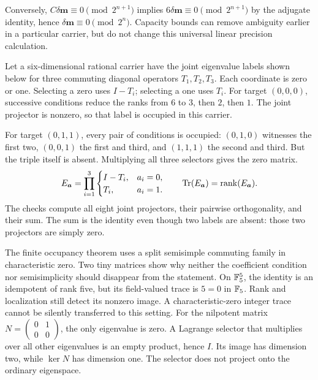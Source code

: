 Conversely, $C\delta\bm m\equiv0\pmod{2^{n+1}}$ implies $6\delta\bm m\equiv0\pmod{2^{n+1}}$ by the adjugate identity, hence $\delta\bm m\equiv0\pmod{2^n}$. Capacity bounds can remove ambiguity earlier in a particular carrier, but do not change this universal linear precision calculation.

Let a six-dimensional rational carrier have the joint eigenvalue labels shown below for three commuting diagonal operators $T_1,T_2,T_3$. Each coordinate is zero or one. Selecting a zero uses $I-T_i$; selecting a one uses $T_i$.
For target $(0,0,0)$, successive conditions reduce the ranks from $6$ to $3$, then $2$, then $1$. The joint projector is nonzero, so that label is occupied in this carrier.

For target $(0,1,1)$, every pair of conditions is occupied: $(0,1,0)$ witnesses the first two, $(0,0,1)$ the first and third, and $(1,1,1)$ the second and third. But the triple itself is absent. Multiplying all three selectors gives the zero matrix.
\[
E_{\bm a}=\prod_{i=1}^{3}
\begin{cases}I-T_i,&a_i=0,\\T_i,&a_i=1.\end{cases}
\qquad \operatorname{Tr}(E_{\bm a})=\operatorname{rank}(E_{\bm a}).
\]
The checks compute all eight joint projectors, their pairwise orthogonality, and their sum. The sum is the identity even though two labels are absent: those two projectors are simply zero.

The finite occupancy theorem uses a split semisimple commuting family in characteristic zero. Two tiny matrices show why neither the coefficient condition nor semisimplicity should disappear from the statement.
On $\mathbb F_5^5$, the identity is an idempotent of rank five, but its field-valued trace is $5=0$ in $\mathbb F_5$. Rank and localization still detect its nonzero image. A characteristic-zero integer trace cannot be silently transferred to this setting.
For the nilpotent matrix $N=\left(\begin{smallmatrix}0&1\\0&0\end{smallmatrix}\right)$, the only eigenvalue is zero. A Lagrange selector that multiplies over all other eigenvalues is an empty product, hence $I$. Its image has dimension two, while $\ker N$ has dimension one. The selector does not project onto the ordinary eigenspace.

